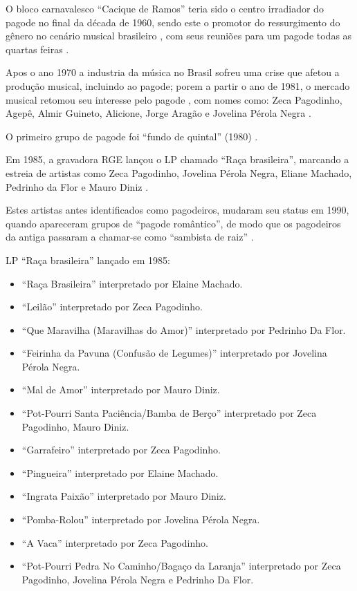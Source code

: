 \begin{description}
O bloco carnavalesco ``Cacique de Ramos'' teria sido o centro irradiador do pagode no final da década de 1960,
sendo este o promotor do ressurgimento do gênero no cenário musical brasileiro \cite{sedano2018bezerra},
com seus reuniões  para um pagode todas as quartas feiras  \cite[pp. 210]{diniz2006almanaque}.

Apos o ano 1970 a industria da música no Brasil sofreu uma crise que afetou a produção musical, 
incluindo ao pagode;
porem a partir o ano de 1981, o mercado musical retomou seu interesse pelo pagode \cite{sedano2018bezerra},
com nomes como: Zeca Pagodinho, Agepê, Almir Guineto, Alicione, 
Jorge Aragão e Jovelina Pérola Negra \cite[pp. 130]{perna2002samba} \cite{sedano2018bezerra}.

O primeiro grupo de pagode foi ``fundo de quintal'' (1980) \cite[pp. 130]{perna2002samba} \cite{fundodequintal}.

Em 1985, a gravadora RGE lançou o LP chamado  ``Raça brasileira'', 
marcando a estreia de artistas como 
Zeca Pagodinho, 
Jovelina Pérola Negra, 
Eliane Machado,
Pedrinho da Flor e
Mauro Diniz \cite[pp. 211]{diniz2006almanaque}.

Estes artistas antes identificados como pagodeiros, mudaram seu status em 1990, 
 quando apareceram grupos de ``pagode romântico'', 
de modo que os pagodeiros da antiga passaram a chamar-se como ``sambista de raiz''  \cite{sedano2018bezerra}. 

\begin{example} LP ``Raça brasileira'' lançado em 1985:

\begin{itemize}
\item ``Raça Brasileira'' interpretado por Elaine Machado.
\item ``Leilão'' interpretado por Zeca Pagodinho.
\item ``Que Maravilha (Maravilhas do Amor)'' interpretado por Pedrinho Da Flor.
\item ``Feirinha da Pavuna (Confusão de Legumes)'' interpretado por Jovelina Pérola Negra.
\item ``Mal de Amor''  interpretado por  Mauro Diniz.
\item ``Pot-Pourri Santa Paciência/Bamba de Berço'' interpretado por Zeca Pagodinho, Mauro Diniz.
\item ``Garrafeiro'' interpretado por Zeca Pagodinho.
\item ``Pingueira'' interpretado por Elaine Machado.
\item ``Ingrata Paixão'' interpretado por Mauro Diniz.
\item ``Pomba-Rolou'' interpretado por  Jovelina Pérola Negra.
\item ``A Vaca'' interpretado por Zeca Pagodinho.
\item ``Pot-Pourri Pedra No Caminho/Bagaço da Laranja'' interpretado por Zeca Pagodinho, Jovelina Pérola Negra e Pedrinho Da Flor.
\end{itemize}
\end{example}


\end{description}
